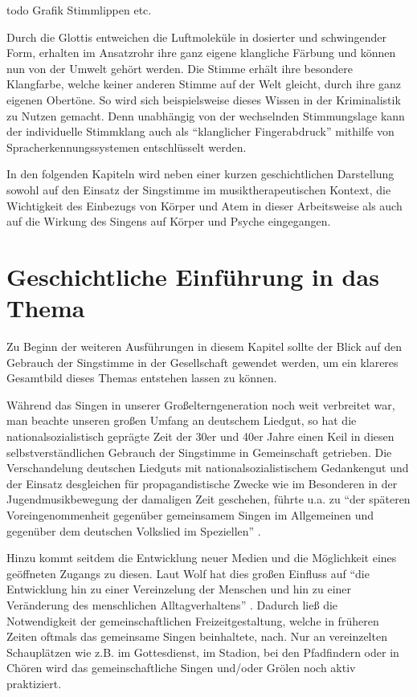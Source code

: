 todo Grafik Stimmlippen etc.

Durch die Glottis entweichen die Luftmoleküle in dosierter und schwingender Form, erhalten im Ansatzrohr ihre ganz eigene klangliche Färbung und können nun von der Umwelt gehört werden. Die Stimme erhält ihre besondere Klangfarbe, welche keiner anderen Stimme auf der Welt gleicht, durch ihre ganz eigenen Obertöne. So wird sich beispielsweise dieses Wissen in der Kriminalistik zu Nutzen gemacht. Denn unabhängig von der wechselnden Stimmungslage kann der individuelle Stimmklang auch als "`klanglicher Fingerabdruck"' \autocite[482]{rittner2009a} mithilfe von Spracherkennungssystemen entschlüsselt werden. 

In den folgenden Kapiteln wird neben einer kurzen geschichtlichen Darstellung sowohl auf den Einsatz der Singstimme im musiktherapeutischen Kontext, die Wichtigkeit des Einbezugs von Körper und Atem in dieser Arbeitsweise als auch auf die Wirkung des Singens auf Körper und Psyche eingegangen.

\section{Geschichtliche Einführung in das Thema}
Zu Beginn der weiteren Ausführungen in diesem Kapitel sollte der Blick auf den Gebrauch der Singstimme in der Gesellschaft gewendet werden, um ein klareres Gesamtbild dieses Themas entstehen lassen zu können.

Während das Singen in unserer Großelterngeneration noch weit verbreitet war, man beachte unseren großen Umfang an deutschem Liedgut, so hat die nationalsozialistisch geprägte Zeit der 30er und 40er Jahre einen Keil in diesen selbstverständlichen Gebrauch der Singstimme in Gemeinschaft getrieben.
Die Verschandelung deutschen Liedguts mit nationalsozialistischem Gedankengut und der Einsatz desgleichen für propagandistische Zwecke wie im Besonderen in der Jugendmusikbewegung der damaligen Zeit geschehen, führte u.a. zu "`der späteren Voreingenommenheit gegenüber gemeinsamem Singen im Allgemeinen und gegenüber dem deutschen Volkslied im Speziellen"' \autocite[9]{wolf2012}.

Hinzu kommt seitdem die Entwicklung neuer Medien und die Möglichkeit eines geöffneten Zugangs zu diesen. Laut Wolf hat dies großen Einfluss auf "`die Entwicklung hin zu einer Vereinzelung der Menschen und hin zu einer Veränderung des menschlichen Alltagverhaltens"' \autocite[10]{wolf2012}. Dadurch ließ die Notwendigkeit der gemeinschaftlichen Freizeitgestaltung, welche in früheren Zeiten oftmals das gemeinsame Singen beinhaltete, nach. Nur an vereinzelten Schauplätzen wie z.B. im Gottesdienst, im Stadion, bei den Pfadfindern oder in Chören wird das gemeinschaftliche Singen und/oder Grölen noch aktiv praktiziert.

